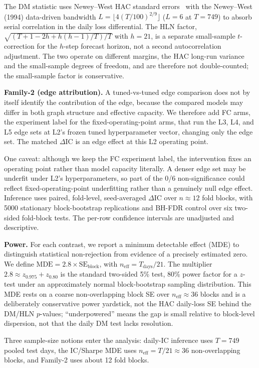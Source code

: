 \documentclass[sigconf,nonacm]{acmart}
\begin{document}
The DM statistic uses Newey--West HAC standard errors~\cite{newey1987simple} with the Newey--West (1994) data-driven bandwidth $L=\lfloor 4(T/100)^{2/9}\rfloor$ ($L=6$ at $T=749$) to absorb serial correlation in the daily loss differential. The HLN factor, $\sqrt{(T+1-2h+h(h-1)/T)/T}$ with $h=21$, is a separate small-sample $t$-correction for the $h$-step forecast horizon, not a second autocorrelation adjustment. The two operate on different margins, the HAC long-run variance and the small-sample degrees of freedom, and are therefore not double-counted; the small-sample factor is conservative.

\textbf{Family-2 (edge attribution).} A tuned-vs-tuned edge comparison does not by itself identify the contribution of the edge, because the compared models may differ in both graph structure and effective capacity. We therefore add FC arms, the experiment label for the fixed-operating-point arms, that run the L3, L4, and L5 edge sets at L2's frozen tuned hyperparameter vector, changing only the edge set. The matched $\Delta$IC is an edge effect at this L2 operating point.

One caveat: although we keep the FC experiment label, the intervention fixes an operating point rather than model capacity literally. A denser edge set may be underfit under L2's hyperparameters, so part of the 0/6 non-significance could reflect fixed-operating-point underfitting rather than a genuinely null edge effect. Inference uses paired, fold-level, seed-averaged $\Delta$IC over $n\approx12$ fold blocks, with 5000 stationary block-bootstrap replications and BH-FDR control over six two-sided fold-block tests. The per-row confidence intervals are unadjusted and descriptive.

\textbf{Power.} For each contrast, we report a minimum detectable effect (MDE) to distinguish statistical non-rejection from evidence of a precisely estimated zero. We define $\text{MDE}=2.8\times\text{SE}_{\text{block}}$, with $n_{\text{eff}}=T_{\text{days}}/21$. The multiplier $2.8\approx z_{0.975}+z_{0.80}$ is the standard two-sided 5\% test, 80\% power factor for a $z$-test under an approximately normal block-bootstrap sampling distribution. This MDE rests on a coarse non-overlapping block SE over $n_{\text{eff}}\approx36$ blocks and is a deliberately conservative power yardstick, not the HAC daily-loss SE behind the DM/HLN $p$-values; ``underpowered'' means the gap is small relative to block-level dispersion, not that the daily DM test lacks resolution.

Three sample-size notions enter the analysis: daily-IC inference uses $T=749$ pooled test days, the IC/Sharpe MDE uses $n_{\text{eff}}=T/21\approx36$ non-overlapping blocks, and Family-2 uses about 12 fold blocks.
\end{document}
